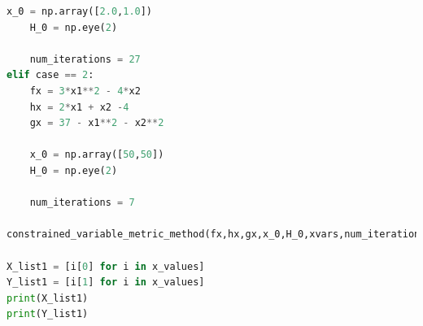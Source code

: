 \documentclass{article}
\begin{document}
\begin{lstlisting}[language=Python, caption=main.py]
    x_0 = np.array([2.0,1.0])
    H_0 = np.eye(2)

    num_iterations = 27
elif case == 2:
    fx = 3*x1**2 - 4*x2
    hx = 2*x1 + x2 -4
    gx = 37 - x1**2 - x2**2

    x_0 = np.array([50,50])
    H_0 = np.eye(2)

    num_iterations = 7

constrained_variable_metric_method(fx,hx,gx,x_0,H_0,xvars,num_iterations)

X_list1 = [i[0] for i in x_values]
Y_list1 = [i[1] for i in x_values]
print(X_list1)
print(Y_list1)


\end{lstlisting}
\end{document}
